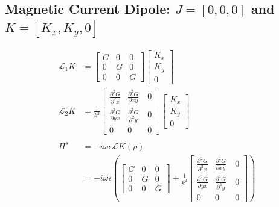 \documentclass{article}
\newcommand{\0}{\varnothing}
\begin{document}
\subsection{Magnetic Current Dipole: $J = [0,0,0]$ and $K = [K_x,K_y,0]$}
\begin{minipage}{0.5\textwidth}
\begin{align*}
    \mathcal{L}_1 K &= 
    \left[ \begin{array}{ccc} G & 0 & 0 \\ 
                            0 & G & 0\\ 
                            0 & 0 & G \end{array} \right]
        \left[ \begin{array}{c} 
        K_x \\ K_y \\ 0 \end{array} \right]\\
    \mathcal{L}_2 K &= \frac{1}{k^2} \left[ \begin{array}{ccc} \frac{\partial^2 G }{\partial^2 x} & \frac{\partial^2 G }{\partial xy}\ & 0 \\ 
                            \frac{\partial^2 G}{\partial yx} & \frac{\partial^2 G}{\partial^2 y} &0\\ 
                            0 & 0 &0 \end{array} \right]
                                    \left[ \begin{array}{c} 
                            K_x \\ K_y \\ 0 \end{array} \right]\\
    \ \\
    H^s &= -i\omega\epsilon \mathcal{L} K (\rho) \\ &=-i\omega\epsilon 
    \left( \left[ \begin{array}{ccc} G & 0 & 0 \\ 
                            0 & G & 0\\ 
                            0 & 0 & G \end{array} \right] + \frac{1}{k^2} \left[ \begin{array}{ccc} \frac{\partial^2 G }{\partial^2 x} & \frac{\partial^2 G }{\partial xy}\ & 0 \\ 
                            \frac{\partial^2 G}{\partial yx} & \frac{\partial^2 G}{\partial^2 y} &0\\ 
                            0 & 0 &0 \end{array} \right] \right)

\end{align*}
\end{minipage}
\end{document}
